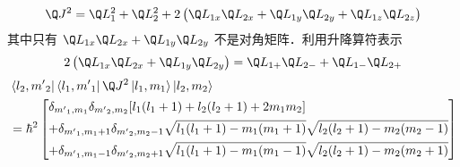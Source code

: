   \begin{equation}
  {\Q J^2} = \Q L_1^2 + \Q L_2^2 + 2\left( {{{\Q L}_{1x}}{{\Q L}_{2x}} + {{\Q L}_{1y}}{{\Q L}_{2y}} + {{\Q L}_{1z}}{{\Q L}_{2z}}} \right)
\end{equation}
其中只有 ${\Q L_{1x}}{\Q L_{2x}} + {\Q L_{1y}}{\Q L_{2y}}$  不是对角矩阵．利用升降算符表示
  \begin{equation}
  2\left( {{{\Q L}_{1x}}{{\Q L}_{2x}} + {{\Q L}_{1y}}{{\Q L}_{2y}}} \right) = {\Q L_{1 + }}{\Q L_{2 - }} + {\Q L_{1 - }}{\Q L_{2 + }}
\end{equation} 
\begin{equation}\begin{aligned}
 &\left\langle {{l_2},{{m'}_2}} \right|\left\langle {{l_1},{{m'}_1}} \right|{\Q J^2}\left| {{l_1},{m_1}} \right\rangle \left| {{l_2},{m_2}} \right\rangle  \\
&= {\hbar ^2}\left[ \begin{gathered}
  {\delta _{{{m'}_1},{m_1}}}{\delta _{{{m'}_2},{m_2}}}[{l_1}({l_1} + 1) + {l_2}({l_2} + 1) + 2{m_1}{m_2}] \hfill \\
   + {\delta _{{{m'}_1},{m_1} + 1}}{\delta _{{{m'}_2},{m_2} - 1}}\sqrt {{l_1}({l_1} + 1) - {m_1}({m_1} + 1)} \sqrt {{l_2}({l_2} + 1) - {m_2}({m_2} - 1)}  \hfill \\
   + {\delta _{{{m'}_1},{m_1} - 1}}{\delta _{{{m'}_2},{m_2} + 1}}\sqrt {{l_1}({l_1} + 1) - {m_1}({m_1} - 1)} \sqrt {{l_2}({l_2} + 1) - {m_2}({m_2} + 1)}  \hfill \\ 
\end{gathered}  \right]
\end{aligned}\end{equation}
 
